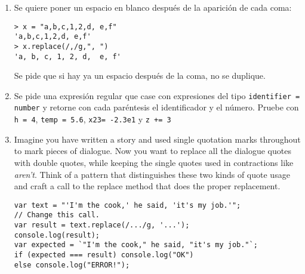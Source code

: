 \begin{Shaded}
\begin{Highlighting}[]
 
    \NormalTok{: }\NormalTok{,}
    \NormalTok{: }\NormalTok{,}
    \NormalTok{: }\NormalTok{,}
    \NormalTok{: }\NormalTok{,}
    \NormalTok{: }\NormalTok{,}
    \NormalTok{: }
  \NormalTok{\};}

 
   \NormalTok{(}\NormalTok{, } 
     \NormalTok{____________;}
  \NormalTok{\});}
\end{Highlighting}
\end{Shaded}

\begin{enumerate}
\def\labelenumi{\arabic{enumi}.}
\setcounter{enumi}{8}
\item
  Se quiere poner un espacio en blanco después de la aparición de cada
  coma:

\begin{verbatim}
> x = "a,b,c,1,2,d, e,f"
'a,b,c,1,2,d, e,f'
> x.replace(/,/g,", ")
'a, b, c, 1, 2, d,  e, f'
\end{verbatim}

  Se pide que si hay ya un espacio después de la coma, no se duplique.
\item
  Se pide una expresión regular que case con expresiones del tipo
  \texttt{identifier = number} y retorne con cada paréntesis el
  identificador y el número. Pruebe con \texttt{h     = 4},
  \texttt{temp = 5.6}, \texttt{x23= -2.3e1} y \texttt{z += 3}
\item
  Imagine you have written a story and used single quotation marks
  throughout to mark pieces of dialogue. Now you want to replace all the
  dialogue quotes with double quotes, while keeping the single quotes
  used in contractions like \emph{aren't}. Think of a pattern that
  distinguishes these two kinds of quote usage and craft a call to the
  replace method that does the proper replacement.

\begin{verbatim}
var text = "'I'm the cook,' he said, 'it's my job.'";
// Change this call.
var result = text.replace(/.../g, '...');
console.log(result);
var expected = `"I'm the cook," he said, "it's my job."`;
if (expected === result) console.log("OK")
else console.log("ERROR!");
\end{verbatim}
\end{enumerate}
